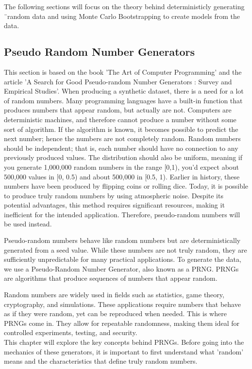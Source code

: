The following sections will focus on the theory behind deterministicly generating ¨random data and using Monte Carlo Bootstrapping to create models from the data.

\subsection{Pseudo Random Number Generators}
This section is based on the book 'The Art of Computer Programming'\cite{knuth} and the article 'A Search for Good Pseudo-random Number Generators : Survey and Empirical Studies'\cite{GoodPRNG}.
When producing a synthetic dataset, there is a need for a lot of random numbers. Many programming languages have a built-in function that produces numbers that appear random, but actually are not. Computers are deterministic machines, and therefore cannot produce a number without some sort of algorithm. If the algorithm is known, it becomes possible to predict the next number; hence the numbers are not completely random. Random numbers should be independent; that is, each number should have no connection to any previously produced values. The distribution should also be uniform, meaning if you generate 1,000,000 random numbers in the range [0,1), you'd expect about 500,000 values in [0, 0.5) and about 500,000 in [0.5, 1). Earlier in history, these numbers have been produced by flipping coins or rolling dice. Today, it is possible to produce truly random numbers by using atmospheric noise. Despite its potential advantages, this method requires significant resources, making it inefficient for the intended application. Therefore, pseudo-random numbers will be used instead.
\newline

\noindent Pseudo-random numbers behave like random numbers but are deterministically generated from a seed value. While
these numbers are not truly random, they are sufficiently unpredictable for many practical applications.
To generate the data, we use a Pseudo-Random Number Generator, also known as a PRNG.
PRNGs are algorithms that produce sequences of numbers that appear random.
\newline

\noindent Random numbers are widely used in fields such as statistics, game theory, cryptography, and simulations. These applications require numbers that behave
as if they were random, yet can be reproduced when needed. This is where
PRNGs come in. They allow for repeatable randomness, making them ideal for
controlled experiments, testing, and security.
\\
This chapter will explore the key concepts behind PRNGs. Before going into the
mechanics of these generators, it is important to first understand what ’random’
means and the characteristics that define truly random numbers.

